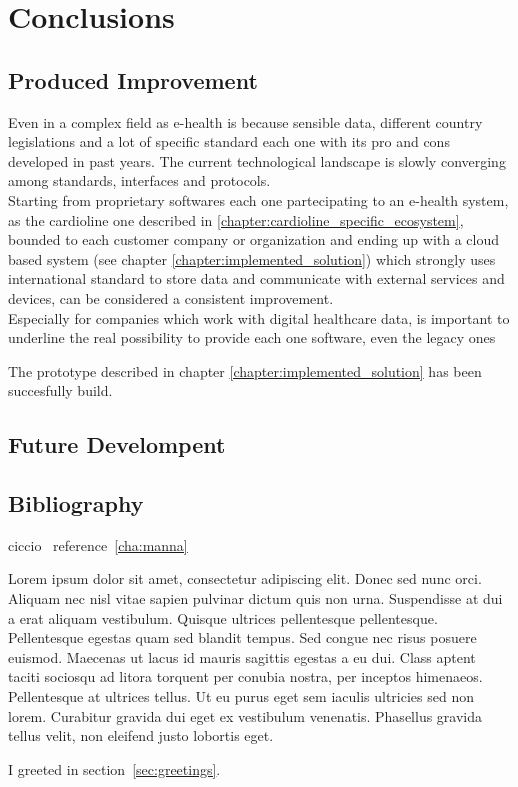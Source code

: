 \chapter{Conclusions}
\section{Produced Improvement}
Even in a complex field as e-health is because sensible data, different country legislations and a lot of specific standard each one with its pro and cons developed in past years. The current technological landscape is slowly converging among standards, interfaces and protocols.\\
Starting from proprietary softwares each one partecipating to an e-health system, as the cardioline one described in \ref{chapter:cardioline_specific_ecosystem}, bounded to each customer company or organization and ending up with a cloud based system (see chapter \ref{chapter:implemented_solution}) which strongly uses international standard to store data and communicate with external services and devices, can be considered a consistent improvement.\\
Especially for companies which work with digital healthcare data, is important to underline the real possibility to provide each one software, even the legacy ones

The prototype described in chapter \ref{chapter:implemented_solution} has been succesfully build. 
\section{Future Develompent}
\section{Bibliography}

ciccio~\label{cha:manna}
reference~\ref{cha:manna}

Lorem ipsum dolor sit amet, consectetur adipiscing elit. Donec sed nunc orci. Aliquam nec nisl vitae sapien pulvinar dictum quis non urna. Suspendisse at dui a erat aliquam vestibulum. Quisque ultrices pellentesque pellentesque. Pellentesque egestas quam sed blandit tempus. Sed congue nec risus posuere euismod. Maecenas ut lacus id mauris sagittis egestas a eu dui. Class aptent taciti sociosqu ad litora torquent per conubia nostra, per inceptos himenaeos. Pellentesque at ultrices tellus. Ut eu purus eget sem iaculis ultricies sed non lorem. Curabitur gravida dui eget ex vestibulum venenatis. Phasellus gravida tellus velit, non eleifend justo lobortis eget. 


I greeted in section~\ref{sec:greetings}.
